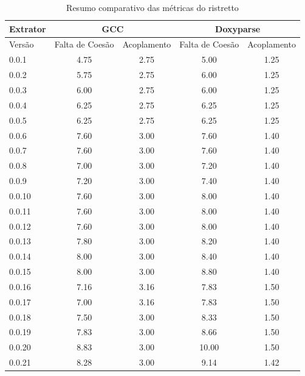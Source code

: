 \begin{table}
\caption{Resumo comparativo das métricas do ristretto}
\centering
\begin{tabular}{| l | c c | c c |}
\hline
Extrator  & \multicolumn{2}{|c|}{GCC}        & \multicolumn{2}{|c|}{Doxyparse} \\
\hline
Versão    & Falta de Coesão & Acoplamento    & Falta de Coesão & Acoplamento   \\
\hline
0.0.1     & 4.75            & 2.75           & 5.00            & 1.25          \\
0.0.2     & 5.75            & 2.75           & 6.00            & 1.25          \\
0.0.3     & 6.00            & 2.75           & 6.00            & 1.25          \\
0.0.4     & 6.25            & 2.75           & 6.25            & 1.25          \\
0.0.5     & 6.25            & 2.75           & 6.25            & 1.25          \\
0.0.6     & 7.60            & 3.00           & 7.60            & 1.40          \\
0.0.7     & 7.60            & 3.00           & 7.60            & 1.40          \\
0.0.8     & 7.00            & 3.00           & 7.20            & 1.40          \\
0.0.9     & 7.20            & 3.00           & 7.40            & 1.40          \\
0.0.10    & 7.60            & 3.00           & 8.00            & 1.40          \\
0.0.11    & 7.60            & 3.00           & 8.00            & 1.40          \\
0.0.12    & 7.60            & 3.00           & 8.00            & 1.40          \\
0.0.13    & 7.80            & 3.00           & 8.20            & 1.40          \\
0.0.14    & 8.00            & 3.00           & 8.40            & 1.40          \\
0.0.15    & 8.00            & 3.00           & 8.80            & 1.40          \\
0.0.16    & 7.16            & 3.16           & 7.83            & 1.50          \\
0.0.17    & 7.00            & 3.16           & 7.83            & 1.50          \\
0.0.18    & 7.50            & 3.00           & 8.33            & 1.50          \\
0.0.19    & 7.83            & 3.00           & 8.66            & 1.50          \\
0.0.20    & 8.83            & 3.00           & 10.00           & 1.50          \\
0.0.21    & 8.28            & 3.00           & 9.14            & 1.42          \\
\hline
\end{tabular}
\label{tab:comparacao-metricas}
\end{table}

